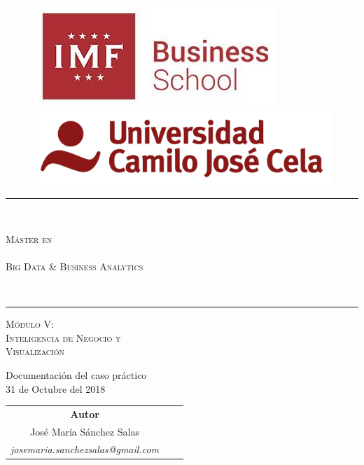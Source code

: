 \documentclass[a4paper,10pt,titlepage,oneside,openright]{book}
\begin{document}
\thispagestyle{empty}
\begin{figure}[h]
\includegraphics[scale=0.3]{logo-imf.png} \hspace{80mm}
\includegraphics[scale=0.25]{logo-ucjc.png}
\centering
\end{figure}

\vspace{5mm}

\begin{center}
\rule{150mm}{0.1mm} \\
\vspace{5mm}
\begin{Huge}
 \textsc{Máster en \\ ~ \\ Big Data \& Business Analytics}
\end{Huge}
\vspace{5mm} \\
\rule{150mm}{0.5mm}

\vspace{20mm}

\begin{huge}
  \textsc{Módulo V: \\ Inteligencia de Negocio y \\ Visualización} \\ \vspace{15mm}
\end{huge}

\begin{LARGE}
 Documentación del caso práctico\\ \vspace{5mm}
 {\large 31 de Octubre del 2018}
\end{LARGE}

\vspace{25mm}

\begin{Large}
\begin{center}
\begin{tabular}{ccc}
\textbf{Autor} \\
José María Sánchez Salas \\
\textit{josemaria.sanchezsalas@gmail.com}
\end{tabular}
\end{center}
\end{Large}
\end{center}
\newpage
\thispagestyle{empty}
\end{document}
